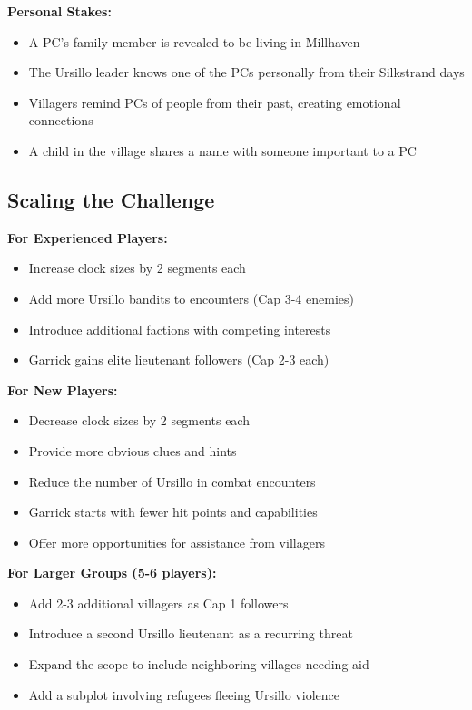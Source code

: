 \documentclass[11pt]{article}
\begin{document}
\textbf{Personal Stakes:}
\begin{itemize}
\item A PC's family member is revealed to be living in Millhaven
\item The Ursillo leader knows one of the PCs personally from their Silkstrand days
\item Villagers remind PCs of people from their past, creating emotional connections
\item A child in the village shares a name with someone important to a PC
\end{itemize}

\subsection{Scaling the Challenge}

\textbf{For Experienced Players:}
\begin{itemize}
\item Increase clock sizes by 2 segments each
\item Add more Ursillo bandits to encounters (Cap 3-4 enemies)
\item Introduce additional factions with competing interests
\item Garrick gains elite lieutenant followers (Cap 2-3 each)
\end{itemize}

\textbf{For New Players:}
\begin{itemize}
\item Decrease clock sizes by 2 segments each
\item Provide more obvious clues and hints
\item Reduce the number of Ursillo in combat encounters
\item Garrick starts with fewer hit points and capabilities
\item Offer more opportunities for assistance from villagers
\end{itemize}

\textbf{For Larger Groups (5-6 players):}
\begin{itemize}
\item Add 2-3 additional villagers as Cap 1 followers
\item Introduce a second Ursillo lieutenant as a recurring threat
\item Expand the scope to include neighboring villages needing aid
\item Add a subplot involving refugees fleeing Ursillo violence
\end{itemize}
\end{document}

